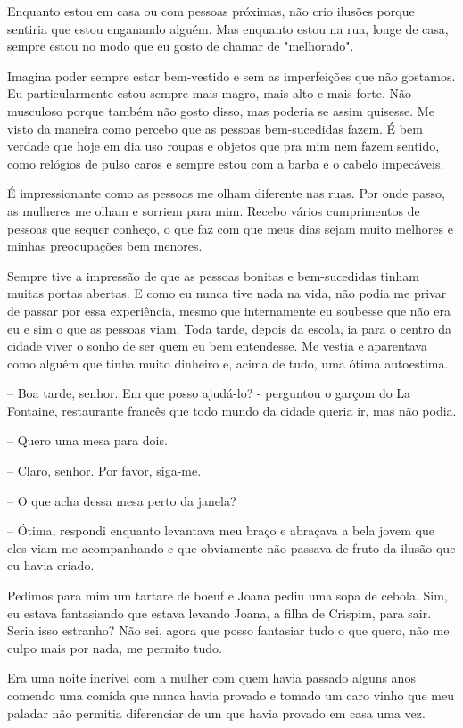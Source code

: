 Enquanto estou em casa ou com pessoas próximas, não crio ilusões porque sentiria que estou enganando alguém. Mas enquanto estou na rua, longe de casa, sempre estou no modo que eu gosto de chamar de "melhorado".

Imagina poder sempre estar bem-vestido e sem as imperfeições que não gostamos. Eu particularmente estou sempre mais magro, mais alto e mais forte. Não musculoso porque também não gosto disso, mas poderia se assim quisesse. Me visto da maneira como percebo que as pessoas bem-sucedidas fazem. É bem verdade que hoje em dia uso roupas e objetos que pra mim nem fazem sentido, como relógios de pulso caros e sempre estou com a barba e o cabelo impecáveis.

É impressionante como as pessoas me olham diferente nas ruas. Por onde passo, as mulheres me olham e sorriem para mim. Recebo vários cumprimentos de pessoas que sequer conheço, o que faz com que meus dias sejam muito melhores e minhas preocupações bem menores.

Sempre tive a impressão de que as pessoas bonitas e bem-sucedidas tinham muitas portas abertas. E como eu nunca tive nada na vida, não podia me privar de passar por essa experiência, mesmo que internamente eu soubesse que não era eu e sim o que as pessoas viam. Toda tarde, depois da escola, ia para o centro da cidade viver o sonho de ser quem eu bem entendesse. Me vestia e aparentava como alguém que tinha muito dinheiro e, acima de tudo, uma ótima autoestima.

-- Boa tarde, senhor. Em que posso ajudá-lo? - perguntou o garçom do La Fontaine, restaurante francês que todo mundo da cidade queria ir, mas não podia.

-- Quero uma mesa para dois.

-- Claro, senhor. Por favor, siga-me.

-- O que acha dessa mesa perto da janela?

-- Ótima, respondi enquanto levantava meu braço e abraçava a bela jovem que eles viam me acompanhando e que obviamente não passava de fruto da ilusão que eu havia criado.

Pedimos para mim um tartare de boeuf e Joana pediu uma sopa de cebola. Sim, eu estava fantasiando que estava levando Joana, a filha de Crispim, para sair. Seria isso estranho? Não sei, agora que posso fantasiar tudo o que quero, não me culpo mais por nada, me permito tudo.

Era uma noite incrível com a mulher com quem havia passado alguns anos comendo uma comida que nunca havia provado e tomado um caro vinho que meu paladar não permitia diferenciar de um que havia provado em casa uma vez.

